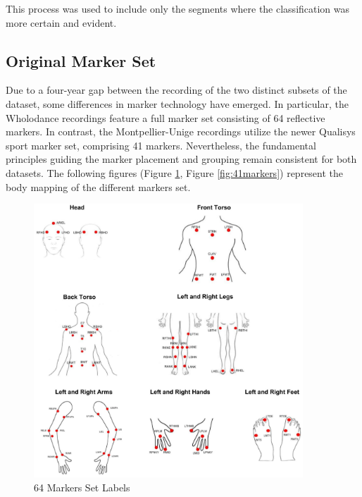 This process was used to include only the segments where the classification was more certain and evident.


\subsection{Original Marker Set}
Due to a four-year gap between the recording of the two distinct subsets of the dataset, 
some differences in marker technology have emerged. 
In particular, the Wholodance recordings feature a full marker set consisting of 64 reflective markers. 
In contrast, the Montpellier-Unige recordings utilize the newer Qualisys sport marker set, comprising 41 markers. 
Nevertheless, the fundamental principles guiding the marker placement and grouping remain consistent for both datasets. 
The following figures (Figure \ref{fig:64markers}, Figure \ref{fig:41markers}) represent the body mapping of the different markers set. 

\begin{figure}[H]
    \centering
    \includegraphics[width=0.9\textwidth]{graphics/full_marker_set.png}
    \caption{64 Markers Set Labels}
    \label{fig:64markers}
\end{figure}

